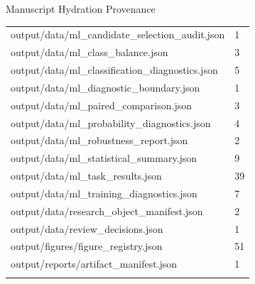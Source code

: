 \documentclass[
  ignorenonframetext,
]{beamer}
\begin{document}
\begin{frame}{Manuscript Hydration Provenance}
\begin{longtable}[]{@{}ll@{}}
output/data/ml\_candidate\_selection\_audit.json & 1 \\
output/data/ml\_class\_balance.json & 3 \\
output/data/ml\_classification\_diagnostics.json & 5 \\
output/data/ml\_diagnostic\_boundary.json & 1 \\
output/data/ml\_paired\_comparison.json & 3 \\
output/data/ml\_probability\_diagnostics.json & 4 \\
output/data/ml\_robustness\_report.json & 2 \\
output/data/ml\_statistical\_summary.json & 9 \\
output/data/ml\_task\_results.json & 39 \\
output/data/ml\_training\_diagnostics.json & 7 \\
output/data/research\_object\_manifest.json & 2 \\
output/data/review\_decisions.json & 1 \\
output/figures/figure\_registry.json & 51 \\
output/reports/artifact\_manifest.json & 1 \\
\bottomrule\noalign{}
\end{longtable}
\end{frame}
\end{document}
